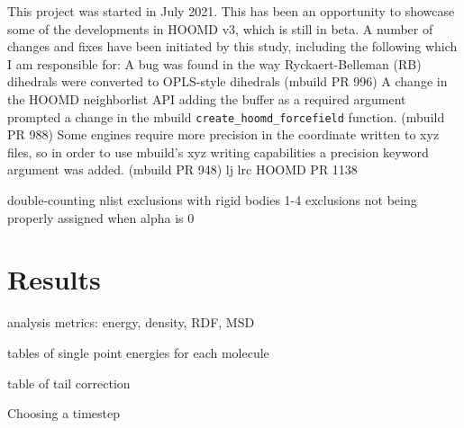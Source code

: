 This project was started in July 2021. 
This has been an opportunity to showcase some of the developments in HOOMD v3, which is still in beta. 
A number of changes and fixes have been initiated by this study, including the following which I am responsible for:
A bug was found in the way Ryckaert-Belleman (RB) dihedrals were converted to OPLS-style dihedrals (mbuild PR 996)
A change in the HOOMD neighborlist API adding the buffer as a required argument prompted a change in the mbuild \lstinline{create_hoomd_forcefield} function. (mbuild PR 988)
Some engines require more precision in the coordinate written to xyz files, so in order to use mbuild's xyz writing capabilities a precision keyword argument was added. (mbuild PR 948)
lj lrc HOOMD PR 1138

double-counting nlist exclusions with rigid bodies
1-4 exclusions not being properly assigned when alpha is 0

\section{Results} 
analysis metrics: energy, density, RDF, MSD

tables of single point energies for each molecule

table of tail correction

Choosing a timestep


